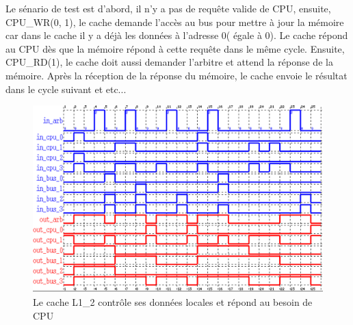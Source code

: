 \documentclass[a4paper,11pt]{report}
\begin{document}
	Le sénario de test est d'abord, il n'y a pas de requête valide de CPU, ensuite, CPU\_WR(0, 1), le cache demande l'accès au bus pour mettre à jour la mémoire car dans le cache il y a déjà les données à l'adresse 0( égale à 0). Le cache répond au CPU dès que la mémoire répond à cette requête dans le même cycle. Ensuite, CPU\_RD(1), le cache doit aussi demander l'arbitre et attend la réponse de la mémoire. Après la réception de la réponse du mémoire, le cache envoie le résultat dans le cycle suivant et etc...
	
	\begin{figure}[!htbp]	
		\includegraphics[width = 16cm]{cache_diag_1.png}
		\caption{Le cache L1\_2 contrôle ses données locales et répond au besoin de CPU}
	\end{figure}
\end{document}
